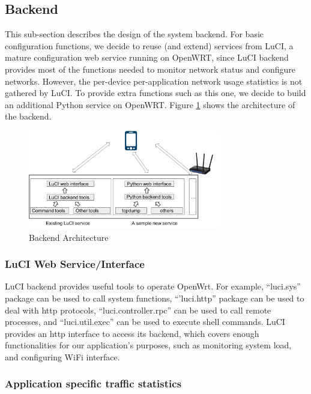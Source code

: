 \subsection{Backend}

This sub-section describes the design of the system backend. For basic configuration functions, we decide to reuse (and extend) services from LuCI, a mature configuration web service running on OpenWRT, since LuCI backend provides most of the functions needed to monitor network status and configure networks. However, the per-device per-application network usage statistics is not gathered by LuCI. To provide extra functions such as this one, we decide to build an additional Python service on OpenWRT. Figure \ref{backend-architecture} shows the architecture of the backend.

\begin{figure}
	\centering
	\includegraphics[width=0.75\textwidth]{backend-architecture.png}
	\caption{Backend Architecture}
	\label{backend-architecture}
\end{figure}

\subsubsection{LuCI Web Service/Interface}

LuCI backend provides useful tools to operate OpenWrt. For example, ``luci.sys'' package can be used to call system functions, ``'luci.http'' package can be used to deal with http protocols, ``luci.controller.rpc'' can be used to call remote processes, and ``luci.util.exec'' can be used to execute shell commands. LuCI provides an http interface to access its backend, which covers enough functionalities for our application's purposes, such as monitoring system load, and configuring WiFi interface.

\subsubsection{Application specific traffic statistics}
\label{sec:app-specific-design}


